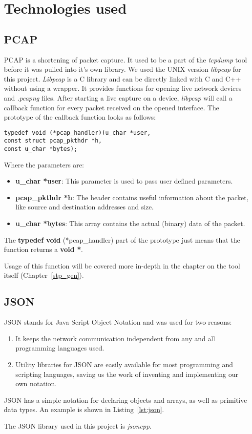 \section{Technologies used}
\subsection*{PCAP}
\label{pcap}
PCAP is a shortening of packet capture.
It used to be a part of the \textit{tcpdump} tool before it was pulled into it's own library.
We used the UNIX version \textit{libpcap} for this project.
\textit{Libpcap} is a C library and can be directly linked with C and C++ without using a wrapper.
It provides functions for opening live network devices and \textit{.pcapng} files.
After starting a live capture on a device, \textit{libpcap} will call a callback function for every packet received on the opened interface.
The prototype of the callback function looks as follows:
\begin{lstlisting}[caption=Pcap Callback Prototype]
typedef void (*pcap_handler)(u_char *user, 
const struct pcap_pkthdr *h,
const u_char *bytes);
\end{lstlisting}
Where the parameters are:
\begin{itemize}
    \item \textbf{u\_char *user}: This parameter is used to pass user defined parameters.
    \item \textbf{pcap\_pkthdr *h}: The header contains useful information about the packet, like source and destination addresses and size.
    \item \textbf{u\_char *bytes}: This array contains the actual (binary) data of the packet.
\end{itemize}
The \textbf{typedef void} (*pcap\_handler) part of the prototype just means that the function returns a \textbf{void *}.

Usage of this function will be covered more in-depth in the chapter on the tool itself (Chapter~\ref{stp_gen}).
\subsection*{JSON}
\label{json}
JSON stands for Java Script Object Notation and was used for two reasons:
\begin{enumerate}
    \item It keeps the network communication independent from any and all programming languages used.
    \item Utility libraries for JSON are easily available for most programming and scripting languages, saving us the work of inventing and implementing our own notation.
\end{enumerate}
JSON has a simple notation for declaring objects and arrays, as well as primitive data types.
An example is shown in Listing~\ref{lst:json}.

The JSON library used in this project is \textit{jsoncpp}\cite{jsoncpp}.

